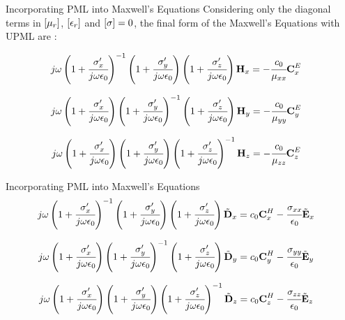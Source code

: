 \documentclass[aspectratio=169]{beamer}
\begin{document}
\begin{frame}{Incorporating PML into Maxwell's Equations}
  Considering only the diagonal terms in $\brackets{\mu_r}$, $\brackets{\epsilon_r}$ and $\brackets{\sigma} = 0$, the final form of the Maxwell's Equations with UPML are \cite{empossible_3d_pml}:

  \begin{align}
    &j\omega\pare{1 + \cfrac{\sigma_x\Prime}{j\omega\epsilon_0}}\inverse \pare{1 + \cfrac{\sigma_y\Prime}{j\omega\epsilon_0}}\pare{1 + \cfrac{\sigma_z\Prime}{j\omega\epsilon_0}} \Hh_x = -\cfrac{c_0}{\mu_{xx}}\CExw
    \label{eq:Hx_upml_freq}
  \end{align}

  \begin{align}
    &j\omega\pare{1 + \cfrac{\sigma_x\Prime}{j\omega\epsilon_0}} \pare{1 + \cfrac{\sigma_y\Prime}{j\omega\epsilon_0}}\inverse\pare{1 + \cfrac{\sigma_z\Prime}{j\omega\epsilon_0}} \Hh_y = -\cfrac{c_0}{\mu_{yy}}\CEyw
    \label{eq:Hy_upml_freq}
  \end{align}

  \begin{align}
    &j\omega\pare{1 + \cfrac{\sigma_x\Prime}{j\omega\epsilon_0}} \pare{1 + \cfrac{\sigma_y\Prime}{j\omega\epsilon_0}}\pare{1 + \cfrac{\sigma_z\Prime}{j\omega\epsilon_0}}\inverse \Hh_z = -\cfrac{c_0}{\mu_{zz}}\CEzw
    \label{eq:Hz_upml_freq}
  \end{align}

\end{frame}

\begin{frame}{Incorporating PML into Maxwell's Equations}
  \begin{align}
    &j\omega\pare{1 + \cfrac{\sigma_x\Prime}{j\omega\epsilon_0}}\inverse \pare{1 + \cfrac{\sigma_y\Prime}{j\omega\epsilon_0}}\pare{1 + \cfrac{\sigma_z\Prime}{j\omega\epsilon_0}} \Dnw_x = c_0\CHxw - \cfrac{\sigma_{xx}}{\epsilon_0}\Enw_x
    \label{eq:Ex_upml_freq}
  \end{align}

  \begin{align}
    &j\omega\pare{1 + \cfrac{\sigma_x\Prime}{j\omega\epsilon_0}} \pare{1 + \cfrac{\sigma_y\Prime}{j\omega\epsilon_0}}\inverse \pare{1 + \cfrac{\sigma_z\Prime}{j\omega\epsilon_0}} \Dnw_y = c_0\CHyw - \cfrac{\sigma_{yy}}{\epsilon_0}\Enw_y
    \label{eq:Ey_upml_freq}
  \end{align}

  \begin{align}
    &j\omega\pare{1 + \cfrac{\sigma_x\Prime}{j\omega\epsilon_0}} \pare{1 + \cfrac{\sigma_y\Prime}{j\omega\epsilon_0}} \pare{1 + \cfrac{\sigma_z\Prime}{j\omega\epsilon_0}}\inverse \Dnw_z = c_0\CHzw - \cfrac{\sigma_{zz}}{\epsilon_0}\Enw_z
    \label{eq:Ez_upml_freq}
  \end{align}

\end{frame}
\end{document}
